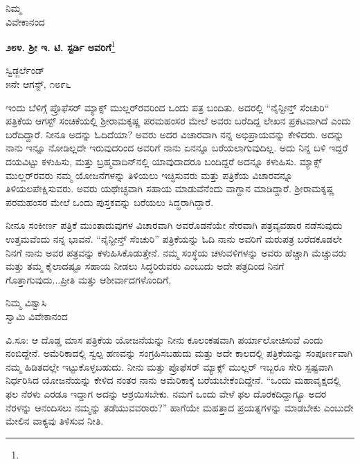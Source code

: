{\flushright
ನಿಮ್ಮ\\ವಿವೇಕಾನಂದ\par}

\begin{center}
\textbf{೨೮೪. ಶ‍್ರೀ ಇ. ಟಿ. ಸ್ಟರ್ಡಿ ಅವರಿಗೆ}\footnote{}
\end{center}

\vspace{-0.75cm}

\begin{flushright}
ಸ್ವಿಡ್ಜರ್ಲೆಂಡ್\\೫ನೇ ಆಗಸ್ಟ್, ೧೮೯೬
\end{flushright}

ಇಂದು ಬೆಳಿಗ್ಗೆ ಪ್ರೊಫೆಸರ್ ಮ್ಯಾಕ್ಸ್ ಮುಲ್ಲರ್‌ರವರಿಂದ ಒಂದು ಪತ್ರ ಬಂದಿತು. ಅದರಲ್ಲಿ “ನೈನ್ಟೀನ್ತ್ ಸೆಂಚುರಿ“ ಪತ್ರಿಕೆಯ ಆಗಸ್ಟ್ ಸಂಚಿಕೆಯಲ್ಲಿ ಶ‍್ರೀರಾಮಕೃಷ್ಣ ಪರಮಹಂಸರ ಮೇಲೆ ಅವರು ಬರೆದಿದ್ದ ಲೇಖನ ಪ್ರಕಟವಾಗಿದೆ ಎಂದು ಬರೆದಿದ್ದಾರೆ. ನೀನೂ ಅದನ್ನು ಓದಿದೆಯಾ? ಅವರು ಅದರ ವಿಚಾರವಾಗಿ ನನ್ನ ಅಭಿಪ್ರಾಯವನ್ನು ಕೇಳಿದರು. ಅದನ್ನು ನಾನು ಇನ್ನೂ ನೋಡಿಲ್ಲದೇ ಇರುವುದರಿಂದ ಅವರಿಗೆ ನಾನು ಏನನ್ನೂ ಬರೆಯಲಾಗುವುದಿಲ್ಲ. ಅದು ನಿನ್ನ ಬಳಿ ಇದ್ದರೆ ದಯವಿಟ್ಟು ಕಳುಹಿಸು, ಮತ್ತು ಬ್ರಹ್ಮವಾದಿನ್‌ನಲ್ಲಿ ಯಾವುದಾದರೂ ಬಂದಿದ್ದರೆ ಅದನ್ನೂ ಕಳುಹಿಸು. ಮ್ಯಾಕ್ಸ್ ಮುಲ್ಲರ್‌ರವರು ನಮ್ಮ ಯೋಜನೆಗಳನ್ನು ತಿಳಿಯಲು ಇಚ್ಛಿಸುವರು ಮತ್ತು ಪತ್ರಿಕೆಯ ವಿಚಾರವನ್ನೂ ತಿಳಿಯಲಪೇಕ್ಷಿಸುವರು. ಅವರು ಯಥೇಚ್ಛವಾಗಿ ಸಹಾಯ ಮಾಡುವೆನೆಂದು ವಾಗ್ದಾನ ಮಾಡಿದ್ದಾರೆ. ಶ‍್ರೀರಾಮಕೃಷ್ಣ ಪರಮಹಂಸರ ಮೇಲೆ ಒಂದು ಪುಸ್ತಕವನ್ನು ಬರೆಯಲು ಸಿದ್ಧರಾಗಿದ್ದಾರೆ.

ನೀನೂ ಸಂಕೀರ್ಣ ಪತ್ರಿಕೆ ಮುಂತಾದುವುಗಳ ವಿಚಾರವಾಗಿ ಅವರೊಡನೆಯೇ ನೇರವಾಗಿ ಪತ್ರವ್ಯವಹಾರ ನಡೆಸುವುದು ಉತ್ತಮವೆಂದು ನನ್ನ ಭಾವನೆ. “ನೈನ್ಟೀನ್ತ್ ಸೆಂಚುರಿ” ಪತ್ರಿಕೆಯನ್ನು ಓದಿ ನಾನು ಅವರಿಗೆ ಮರುಪತ್ರ ಬರೆದಕೂಡಲೇ ನಿನಗೆ ನಾನು ಅವರ ಪತ್ರವನ್ನು ಕಳುಹಿಸಿಕೊಡುತ್ತೇನೆ. ನಮ್ಮ ಸಂಸ್ಥೆಯ ಚಳುವಳಿಗಳನ್ನು ಅವರು ಹೆಚ್ಚಾಗಿ ಮೆಚ್ಚುವರು ಮತ್ತು ತಮ್ಮ ಕೈಲಾದಷ್ಟೂ ಸಹಾಯ ನೀಡಲು ಸಿದ್ಧರಿರುವರು ಎಂಬುದು ಅದೇ ಪತ್ರದಿಂದ ನಿನಗೆ ಗೊತ್ತಾಗುವುದು...ಪ್ರೀತಿ ಮತ್ತು ಆಶೀರ್ವಾದಗಳೊಂದಿಗೆ,

\vspace{-0.4cm}

\begin{flushright}
ನಿಮ್ಮ ವಿಶ್ವಾಸಿ\\ಸ್ವಾಮಿ ವಿವೇಕಾನಂದ
\end{flushright}

\vspace{-0.1cm}

ವಿ.ಸೂ:\enginline{-} ಆ ದೊಡ್ಡ ಮಾಸ ಪತ್ರಿಕೆಯ ಯೋಜನೆಯನ್ನು ನೀನು ಕೂಲಂಕಷವಾಗಿ ಪರ್ಯಾಲೋಚಿಸುವೆ ಎಂದು ನಂಬಿದ್ದೇನೆ. ಅಮೆರಿಕಾದಲ್ಲಿ ಸ್ವಲ್ಪ ಹಣವನ್ನು ಸಂಗ್ರಹಿಸ\break ಬಹುದು ಮತ್ತು ಅದೇ ಕಾಲದಲ್ಲಿ ಪತ್ರಿಕೆಯನ್ನು ಸಂಪೂರ್ಣವಾಗಿ ನಮ್ಮ ಹಿಡಿತದಲ್ಲೇ ಇಟ್ಟುಕೊಳ್ಳಬಹುದು. ನೀನು ಮತ್ತು ಪ್ರೊಫೆಸರ್‌ ಮ್ಯಾಕ್ಸ್ ಮುಲ್ಲರ್ ಇಬ್ಬರೂ ಸೇರಿ ಸ್ಪಷ್ಟವಾಗಿ ನಿರ್ಧರಿಸಿದ ಯೋಜನೆಯನ್ನು ಕೇಳಿದ ನಂತರ ನಾನು ಅಮೆರಿಕಾಕ್ಕೆ ಬರೆಯಬೇಕೆಂದಿದ್ದೇನೆ. “ಒಂದು ಮಹಾವೃಕ್ಷದಲ್ಲಿ ಫಲ ನೆರಳು ಎರಡೂ ಇದ್ದಾಗ ಅದನ್ನು ಆಶ್ರಯಿಸಬೇಕು. ನಮಗೆ ಒಂದು ವೇಳೆ ಫಲ ದೊರಕದಿದ್ದಾಗ್ಯೂ ಅದರ ನೆರಳನ್ನು ಆನಂದಿಸಲು ನಮ್ಮನ್ನು ತಡೆಯುವವರಾರು?” ಹಾಗೆಯೇ ಮಹತ್ತಾದ ಪ್ರಯತ್ನಗಳನ್ನು ಮಾಡಬೇಕು ಎಂಬುದೇ ಮೇಲಿನ ವಾಕ್ಯವು ತಿಳಿಸುವ ನೀತಿ.

